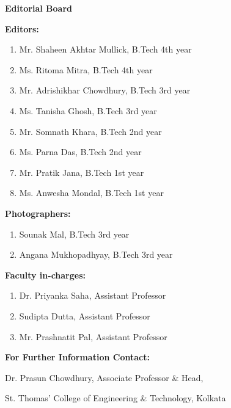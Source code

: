 \thispagestyle{fancy}

\begin{center}
  {\Huge\bfseries Editorial Board\par}
\end{center}

\vspace{0.8cm}
\begin{center}
\begin{minipage}[t][0.80\textheight][t]{0.76\textwidth}
  \normalsize
  {\Large\bfseries Editors:}\par
  \begin{enumerate}[leftmargin=2em,itemsep=2pt,topsep=4pt]
    \item Mr. Shaheen Akhtar Mullick, B.Tech 4th year
    \item Ms. Ritoma Mitra, B.Tech 4th year
    \item Mr. Adrishikhar Chowdhury, B.Tech 3rd year
    \item Ms. Tanisha Ghosh, B.Tech 3rd year
    \item Mr. Somnath Khara, B.Tech 2nd year
    \item Ms. Parna Das, B.Tech 2nd year
    \item Mr. Pratik Jana, B.Tech 1st year
    \item Ms. Anwesha Mondal, B.Tech 1st year
  \end{enumerate}

  \medskip
  {\Large\bfseries Photographers:}\par
  \begin{enumerate}[leftmargin=2em,itemsep=2pt,topsep=4pt]
    \item Sounak Mal, B.Tech 3rd year
    \item Angana Mukhopadhyay, B.Tech 3rd year
    
  \end{enumerate}

  \medskip
  {\Large\bfseries Faculty in-charges:}\par
  \begin{enumerate}[leftmargin=2em,itemsep=2pt,topsep=4pt]
    \item Dr. Priyanka Saha, Assistant Professor
    \item Sudipta Dutta, Assistant Professor
    \item Mr. Prashnatit Pal, Assistant Professor
  \end{enumerate}

  \vfill
  
  \textbf{For Further Information Contact:}\par
  Dr. Prasun Chowdhury, Associate Professor \& Head,\par
  St. Thomas' College of Engineering \& Technology, Kolkata\par
  \par


\end{minipage}
\end{center}
